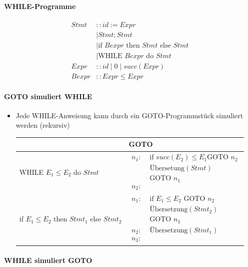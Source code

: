 \documentclass{scrartcl}
\begin{document}
\paragraph{WHILE-Programme}

\begin{align*}
	Stmt & :: id := Expr \\
	& \mid Stmt ; Stmt \\
	& \mid \text{if } Bexpr \text{ then } Stmt \text{ else } Stmt \\
	& \mid \text{WHILE } Bexpr \text{ do } Stmt \\
	Expr & :: id \mid 0 \mid succ(Expr) \\
	Bexpr & :: Expr \leq Expr
\end{align*}

\paragraph{GOTO simuliert WHILE}

\begin{itemize}
	\item Jede WHILE-Anweisung kann durch ein GOTO-Programmstück simuliert werden (rekursiv) \\
	\renewcommand{\arraystretch}{1.2}
	\begin{tabular}{|l|l|}
		\hline 
		 & GOTO \\ 
		\hline 
		WHILE $E_1 \leq E_2$ do $Stmt$ & $\begin{aligned}
			n_1: & \text{ if } succ(E_2) \leq E_1 \text{GOTO } n_2 \\
			& \text{ Übersetung}(Stmt) \\
			& \text{ GOTO } n_1 \\
			n_2: &
		\end{aligned}$ \\ 
		\hline 
		if $E_1 \leq E_2$ then $Stmt_1$ else $Stmt_2$ & $\begin{aligned}
			n_1: & \text{ if } E_1 \leq E_2 \text{ GOTO } n_2 \\
			& \text{ Übersetzung}(Stmt_2) \\
			& \text{ GOTO } n_3 \\
			n_2: & \text{ Übersetzung}(Stmt_1) \\
			n_3: &
		\end{aligned}$ \\ 
		\hline 
	\end{tabular}
\end{itemize}

\paragraph{WHILE simuliert GOTO}
\end{document}
